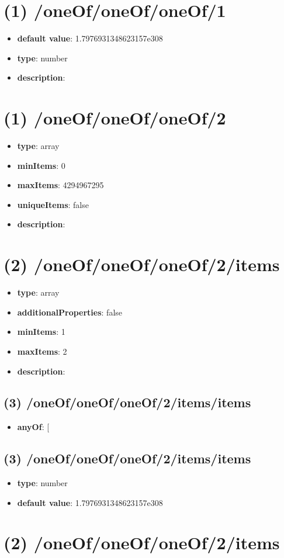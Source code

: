 \section{(1) /oneOf/oneOf/oneOf/1}
\begin{itemize}[leftmargin=1em]\item {\bf default value}: 1.7976931348623157e308
\item {\bf type}: number
\item {\bf description}: 
\end{itemize}\section{(1) /oneOf/oneOf/oneOf/2}
\begin{itemize}[leftmargin=1em]\item {\bf type}: array
\item {\bf minItems}: 0
\item {\bf maxItems}: 4294967295
\item {\bf uniqueItems}: false
\item {\bf description}: 
\end{itemize}\section{(2) /oneOf/oneOf/oneOf/2/items}
\begin{itemize}[leftmargin=2em]\item {\bf type}: array
\item {\bf additionalProperties}: false
\item {\bf minItems}: 1
\item {\bf maxItems}: 2
\item {\bf description}: 
\end{itemize}\subsection{(3) /oneOf/oneOf/oneOf/2/items/items}
\begin{itemize}[leftmargin=3em]\item {\bf anyOf}: [\end{itemize}\subsection{(3) /oneOf/oneOf/oneOf/2/items/items}
\begin{itemize}[leftmargin=3em]\item {\bf type}: number\item {\bf default value}: 1.7976931348623157e308
\end{itemize}\section{(2) /oneOf/oneOf/oneOf/2/items}
